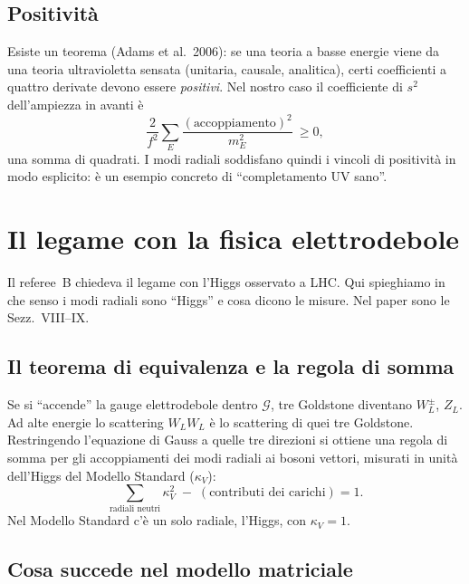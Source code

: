 \documentclass[11pt,a4paper]{article}
\numberwithin{equation}{section}
\theoremstyle{remark}
\newcommand{\G}{\mathcal{G}}
\begin{document}
\subsection{Positività}

Esiste un teorema (Adams et al.\ 2006): se una teoria a basse energie viene da una teoria ultravioletta sensata (unitaria, causale, analitica), certi coefficienti a quattro derivate devono essere \emph{positivi}. Nel nostro caso il coefficiente di $s^2$ dell'ampiezza in avanti è
\[
\frac{2}{f^2}\sum_E\frac{(\text{accoppiamento})^2}{m_E^2}\ \ge0 ,
\]
una somma di quadrati. I modi radiali soddisfano quindi i vincoli di positività in modo esplicito: è un esempio concreto di ``completamento UV sano''.

\section{Il legame con la fisica elettrodebole}
\label{cap:ew}

\begin{dove}
Il referee~B chiedeva il legame con l'Higgs osservato a LHC. Qui spieghiamo in che senso i modi radiali sono ``Higgs'' e cosa dicono le misure. Nel paper sono le Sezz.~VIII--IX.
\end{dove}

\subsection{Il teorema di equivalenza e la regola di somma}

Se si ``accende'' la gauge elettrodebole dentro $\G$, tre Goldstone diventano $W_L^\pm$, $Z_L$. Ad alte energie lo scattering $W_LW_L$ è lo scattering di quei tre Goldstone. Restringendo l'equazione di Gauss a quelle tre direzioni si ottiene una regola di somma per gli accoppiamenti dei modi radiali ai bosoni vettori, misurati in unità dell'Higgs del Modello Standard ($\kappa_V$):
\[
\sum_{\text{radiali neutri}}\kappa_{V}^2\;-\;(\text{contributi dei carichi})=1 .
\]
Nel Modello Standard c'è un solo radiale, l'Higgs, con $\kappa_V=1$.

\subsection{Cosa succede nel modello matriciale}
\end{document}
